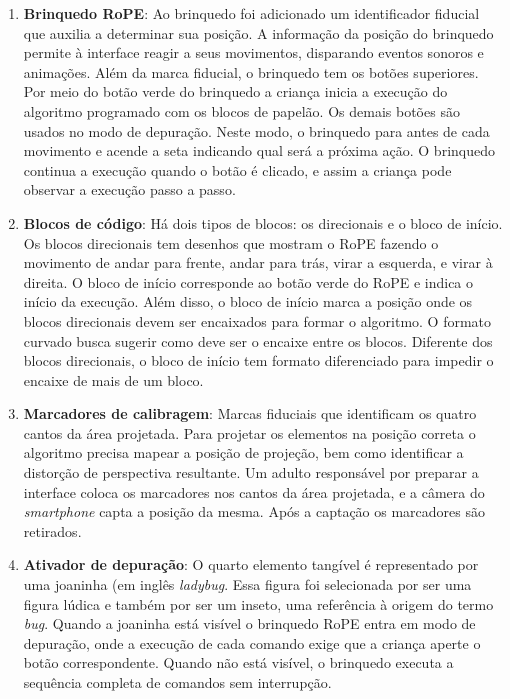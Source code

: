 \begin{enumerate}
\item \textbf{Brinquedo RoPE}: Ao brinquedo foi adicionado um identificador fiducial que auxilia a determinar sua posição. A informação da posição do brinquedo permite à interface reagir a seus movimentos, disparando eventos sonoros e animações. Além da marca fiducial, o brinquedo tem os botões superiores. Por meio do botão verde do brinquedo a criança inicia a execução do algoritmo programado com os blocos de papelão. Os demais botões são usados no modo de depuração. Neste modo, o brinquedo para antes de cada movimento e acende a seta indicando qual será a próxima ação. O brinquedo continua a execução quando o botão é clicado, e assim a criança pode observar a execução passo a passo.
\item \textbf{Blocos de código}:  Há dois tipos de blocos: os direcionais e o bloco de início. Os blocos direcionais tem desenhos que mostram o RoPE fazendo o movimento de andar para frente, andar para trás, virar a esquerda, e virar à direita. O bloco de início corresponde ao botão verde do RoPE e indica o início da execução. Além disso, o bloco de início marca a posição onde os blocos direcionais devem ser encaixados para formar o algoritmo. O formato curvado busca sugerir como deve ser o encaixe entre os blocos. Diferente dos blocos direcionais, o bloco de início tem formato diferenciado para impedir o encaixe de mais de um bloco.
\item \textbf{Marcadores de calibragem}: Marcas fiduciais que identificam os quatro cantos da área projetada. Para projetar os elementos na posição correta o algoritmo precisa mapear a posição de projeção, bem como identificar a distorção de perspectiva resultante. Um adulto responsável por preparar a interface coloca os marcadores nos cantos da área projetada, e a câmera do \textit{smartphone} capta a posição da mesma. Após a captação os marcadores são retirados.
\item \textbf{Ativador de depuração}: O quarto elemento tangível é representado por uma joaninha (em inglês \textit{ladybug}. Essa figura foi selecionada por ser uma figura lúdica e também por ser um inseto, uma referência à origem do termo \textit{bug}. Quando a joaninha está visível o brinquedo RoPE entra em modo de depuração, onde a execução de cada comando exige que a criança aperte o botão correspondente. Quando não está visível, o brinquedo executa a sequência completa de comandos sem interrupção.
\end{enumerate}

